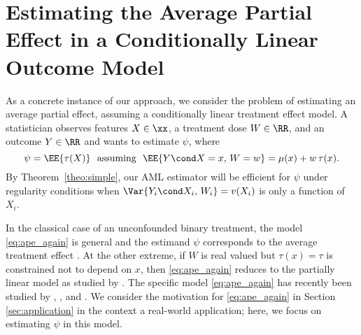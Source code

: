 \documentclass[aos,submission]{imsart}
\theoremstyle{plain}
\theoremstyle{remark}
\begin{document}
\section{Estimating the Average Partial Effect in a Conditionally Linear Outcome Model}
\label{sec:ape}

As a concrete instance of our approach, we consider the problem
of estimating an average partial effect, assuming a conditionally linear treatment effect model.
A statistician observes features $X \in \xx$, a treatment dose $W \in \RR$, and an outcome
$Y \in \RR$ and wants to estimate $\psi$, where
\begin{equation}
\label{eq:ape_again}
\psi = \EE{\tau(X)} \ \text{ assuming } \ \EE{Y \cond X = x, \, W = w} = \mu(x) + w \,\tau(x).
\end{equation}
By Theorem~\ref{theo:simple}, our AML estimator will be efficient for
$\psi$ under regularity conditions when $\Var{Y_i \cond X_i, \, W_i} = v(X_i)$ is only a function of $X_i$.

In the classical case of an unconfounded binary
treatment, the model \eqref{eq:ape_again} is general and the estimand $\psi$ corresponds
to the average treatment effect \citep{rosenbaum1983central,imbens2015causal}. At the other
extreme, if $W$ is real valued but $\tau(x) = \tau$ is constrained not to depend on $x$, then
\eqref{eq:ape_again} reduces to the partially linear model as studied by \citet{robinson1988root}.
The specific model \eqref{eq:ape_again} has recently been studied by \citet*{athey2016generalized}, \citet*{graham2018semiparametrically},
and \citet*{zhao2017selective}.
We consider the motivation for \eqref{eq:ape_again} in Section \ref{sec:application} in the
context a real-world application; here, we focus on estimating $\psi$ in this model.
\end{document}
